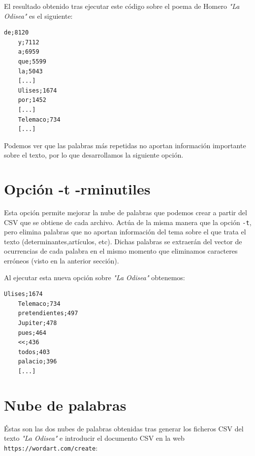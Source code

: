 El resultado obtenido tras ejecutar este código sobre el poema de Homero \textit{"La Odisea"} es el siguiente:

\begin{lstlisting}[frame=single]
	de;8120
	y;7112
	a;6959
	que;5599
	la;5043
	[...]
	Ulises;1674
	por;1452
	[...]
	Telemaco;734
	[...]
\end{lstlisting}
\vspace{0.3cm}

Podemos ver que las palabras más repetidas no aportan información importante sobre el texto, por lo que desarrollamos la siguiente opción.

\newpage

\section{Opción -t -rminutiles}
Esta opción permite mejorar la nube de palabras que podemos crear a partir del CSV que se obtiene de cada archivo. Actúa de la misma manera que la opción \texttt{-t}, pero elimina palabras que no aportan información del tema sobre el que trata el texto (determinantes,artículos, etc). Dichas palabras se extraerán del vector de ocurrencias de cada palabra en el mismo momento que eliminamos caracteres erróneos (visto en la anterior sección).

Al ejecutar esta nueva opción sobre \textit{"La Odisea"} obtenemos:
\begin{lstlisting}[frame=single]
	Ulises;1674
	Telemaco;734
	pretendientes;497
	Jupiter;478
	pues;464
	<<;436
	todos;403
	palacio;396
	[...]
\end{lstlisting}

\section{Nube de palabras}
Éstas son las dos nubes de palabras obtenidas tras generar los ficheros CSV del texto \textit{"La Odisea"} e introducir el documento CSV en la web \texttt{https://wordart.com/create}:

